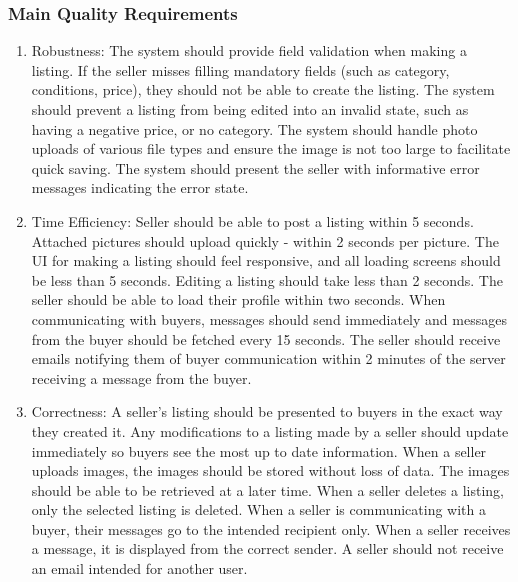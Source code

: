 \documentclass[12pt]{article}
\begin{document}
\subsubsection*{Main Quality Requirements}
\begin{enumerate}[label=\arabic*.]
    \item Robustness: The system should provide field validation when making a listing. If the
          seller misses filling mandatory fields (such as category, conditions, price), they
          should not be able to create the listing. The system should prevent a listing from
          being edited into an invalid state, such as having a negative price, or no category.
          The system should handle photo uploads of various file types and ensure the image is
          not too large to facilitate quick saving. The system should present the seller 
          with informative error messages indicating the error state.

    \item Time Efficiency: Seller should be able to post a listing within 5 seconds. Attached
          pictures should upload quickly - within 2 seconds per picture. The UI for making a
          listing should feel responsive, and all loading screens should be less than 5 seconds.
          Editing a listing should take less than 2 seconds. The seller should be able to load
          their profile within two seconds. When communicating with buyers, messages should send
          immediately and messages from the buyer should be fetched every 15 seconds. The seller
          should receive emails notifying them of buyer communication within 2 minutes of the
          server receiving a message from the buyer.

    \item Correctness: A seller's listing should be presented to buyers in the exact way they
          created it. Any modifications to a listing made by a seller should update immediately
          so buyers see the most up to date information. When a seller uploads images, the
          images should be stored without loss of data. The images should be able to be
          retrieved at a later time. When a seller deletes a listing, only the selected listing
          is deleted. When a seller is communicating with a buyer, their messages go to the
          intended recipient only. When a seller receives a message, it is displayed from the
          correct sender. A seller should not receive an email intended for another user.
\end{enumerate}
\end{document}
